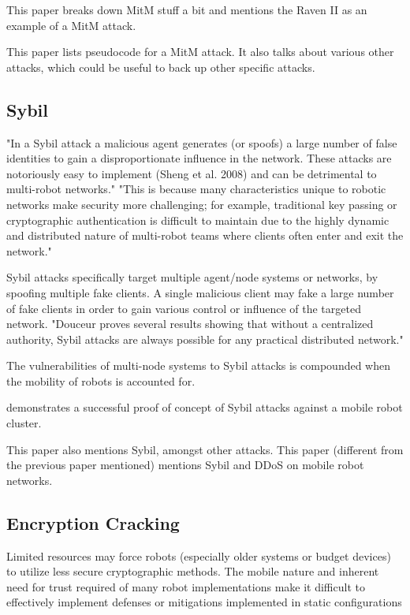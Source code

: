 This paper\cite{Bonaci2012} breaks down MitM stuff a bit and mentions the Raven II as an example of a MitM attack.

This paper \cite{Yousef2018AnalyzingCT} lists pseudocode for a MitM attack. It also talks about various other attacks, which could be useful to back up other specific attacks.

\subsection{Sybil}
\cite{Gil2017GuaranteeingSM}
"In a Sybil attack a malicious agent generates (or spoofs) a large number of false identities to gain a disproportionate influence in the network. These attacks are notoriously easy to implement (Sheng et al. 2008) and can be detrimental to multi-robot networks."
"This is because many characteristics unique to robotic networks make security more challenging; for example, traditional key passing or cryptographic authentication is difficult to maintain due to the highly dynamic and distributed nature of multi-robot teams where clients often enter and exit the network."

Sybil attacks specifically target multiple agent/node systems or networks, by spoofing multiple fake clients.  A single malicious client may fake a large number of fake clients in order to gain various control or influence of the targeted network.  
"Douceur proves several results showing that without a centralized authority, Sybil attacks are always possible for any practical distributed network."

The vulnerabilities of multi-node systems to Sybil attacks is compounded when the mobility of robots is accounted for.  

demonstrates a successful proof of concept of Sybil attacks against a mobile robot cluster. 

This paper \cite{Basan:2017} also mentions Sybil, amongst other attacks.
This paper \cite{Basan2018} (different from the previous paper mentioned) mentions Sybil and DDoS on mobile robot networks.

\subsection{Encryption Cracking}
Limited resources may force robots (especially older systems or budget devices) to utilize less secure cryptographic methods.  The mobile nature and inherent need for trust required of many robot implementations make it difficult to effectively implement defenses or mitigations implemented in static configurations

